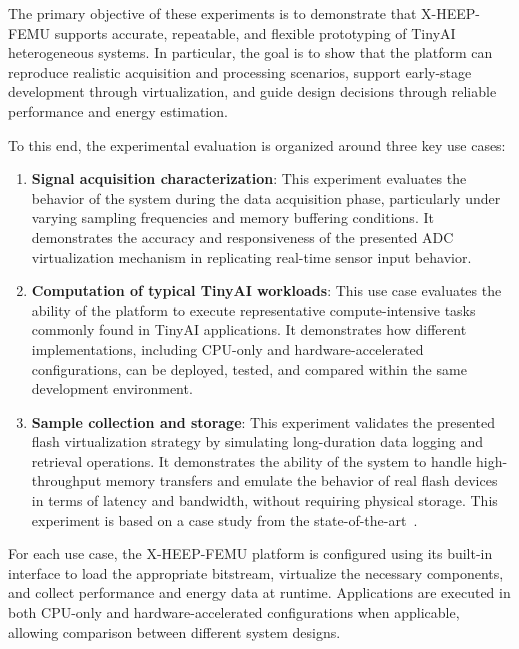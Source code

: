         The primary objective of these experiments is to demonstrate that \mbox{X-HEEP-FEMU} supports accurate, repeatable, and flexible prototyping of TinyAI heterogeneous systems. In particular, the goal is to show that the platform can reproduce realistic acquisition and processing scenarios, support early-stage development through virtualization, and guide design decisions through reliable performance and energy estimation.
        
        To this end, the experimental evaluation is organized around three key use cases:

        \vspace{-1em}
        \begin{enumerate}
            \item \textbf{Signal acquisition characterization}: This experiment evaluates the behavior of the system during the data acquisition phase, particularly under varying sampling frequencies and memory buffering conditions. It demonstrates the accuracy and responsiveness of the presented ADC virtualization mechanism in replicating real-time sensor input behavior.
        
            \item \textbf{Computation of typical TinyAI workloads}: This use case evaluates the ability of the platform to execute representative compute-intensive tasks commonly found in TinyAI applications. It demonstrates how different implementations, including CPU-only and hardware-accelerated configurations, can be deployed, tested, and compared within the same development environment.
        
            \item \textbf{Sample collection and storage}: This experiment validates the presented flash virtualization strategy by simulating long-duration data logging and retrieval operations. It demonstrates the ability of the system to handle high-throughput memory transfers and emulate the behavior of real flash devices in terms of latency and bandwidth, without requiring physical storage. This experiment is based on a case study from the state-of-the-art~\cite{moisture}.
        \end{enumerate}
        \vspace{-1em}
        
        For each use case, the \mbox{X-HEEP-FEMU} platform is configured using its built-in interface to load the appropriate bitstream, virtualize the necessary components, and collect performance and energy data at runtime. Applications are executed in both CPU-only and hardware-accelerated configurations when applicable, allowing comparison between different system designs.

